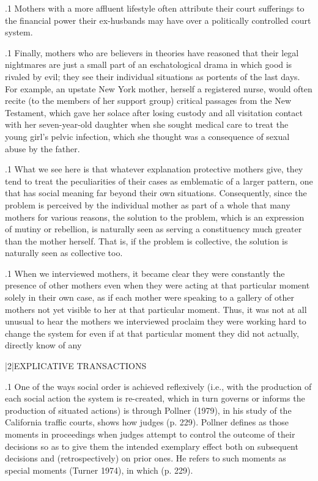 \documentclass[11pt, twoside]{article}
\begin{document}
{\p.1{%
Mothers with a more affluent lifestyle often attribute their court
sufferings to the financial power their ex-husbands may have over a
politically controlled court system.
}%

\p.1{%
Finally, mothers who are believers in  theories have
reasoned that their legal nightmares are just a small part of an eschatological drama in which good is rivaled by evil; they see their individual
situations as portents of the last days. For example, an upstate New
York mother, herself a registered nurse, would often recite (to the members of her support group) critical passages from the New Testament,
which gave her solace after losing custody and all visitation contact with
her seven-year-old daughter when she sought medical care to treat the
young girl’s pelvic infection, which she thought was a consequence of
sexual abuse by the father.
}%

\p.1{%
What we see here is that whatever explanation protective mothers
give, they tend to treat the peculiarities of their cases as emblematic
of a larger pattern, one that has social meaning far beyond their own
situations. Consequently, since the problem is perceived by the individual mother as part of a whole  that  many mothers
for various reasons, the solution to the problem, which is an expression
of mutiny or rebellion, is naturally seen as serving a constituency much
greater than the mother herself. That is, if the problem is collective, the
solution is naturally seen as collective too.
}%

\p.1{%
When we interviewed mothers, it became clear they were constantly
 the presence of other mothers even when they were acting
at that particular moment solely in their own case, as if each mother
were speaking to a gallery of other mothers not yet visible to her at that
particular moment. Thus, it was not at all unusual to hear the mothers we
interviewed proclaim they were working hard to change the system for
 even if at that particular moment they did not actually, directly
know of any 
}%


\s|2|{EXPLICATIVE TRANSACTIONS}

\p.1{%
One of the ways social order is achieved reflexively (i.e., with the
production of each social action the system is re-created, which in turn
governs or informs the production of situated actions) is through  Pollner (1979), in his study of the California
traffic courts, shows how judges  (p. 229). Pollner defines  as
those moments in proceedings when judges attempt to control the outcome of their decisions so as to give them the intended exemplary effect
both on subsequent decisions and (retrospectively) on prior ones. He
refers to such moments as special  moments (Turner 1974), in
which  (p. 229).
}%

}
\end{document}
